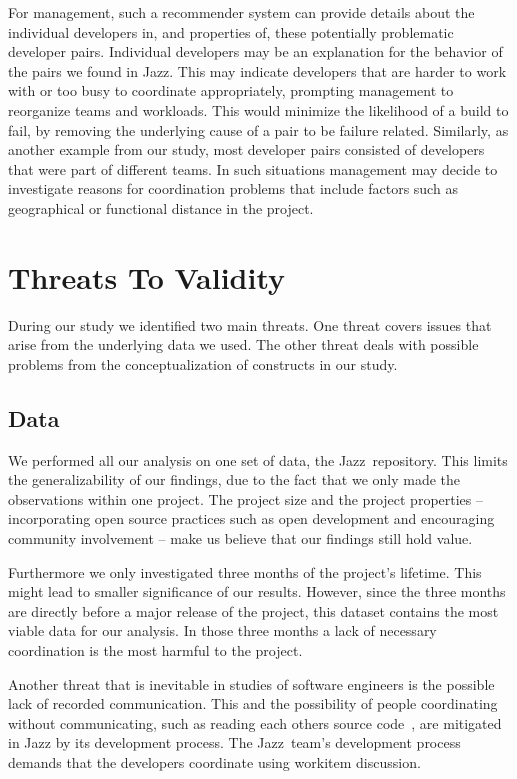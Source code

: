 \documentclass[12pt,oneside]{book}
\begin{document}
For management, such a recommender system can provide details about the
individual developers in, and properties of, these potentially problematic
developer pairs. Individual developers may be an explanation for the behavior of
the pairs we found in Jazz\texttrademark. This may indicate developers that are
harder to work with or too busy to coordinate appropriately, prompting management
to reorganize teams and workloads. This would minimize the likelihood of a build
to fail, by removing the underlying cause of a pair to be failure related.
Similarly, as another example from our study, most developer pairs
consisted of developers that were part of different teams. In such
situations management may decide to investigate reasons for coordination
problems that include factors such as geographical or functional distance in the project.




\section{Threats To Validity}
\label{sec:threats}
During our study we identified two main threats. 
One threat covers issues that arise from the underlying data we used.
The other threat deals with possible problems from the conceptualization of
constructs in our study.

\subsection{Data}
We performed all our analysis on one set of data, the Jazz\texttrademark\
repository. This limits the generalizability of our findings, due to the fact
that we only made the observations within one project. The  
project size and the project properties -- incorporating open
source practices such as open development and encouraging community involvement
-- make us believe that our findings still hold value.

Furthermore we only investigated three months of the project's lifetime. This
might lead to smaller significance of our results. However, since the three
months are directly before a major release of the project, this dataset contains
the most viable data for our analysis. In those three months a lack of necessary
coordination is the most harmful to the project.

Another threat that is inevitable in studies of software engineers is
the possible lack of recorded communication. This and the possibility of people
coordinating without communicating, such as reading each others source
code~\cite{bolici:stc:2009}, are mitigated in Jazz by its development process.
The Jazz\texttrademark\ team's development process demands that the developers
coordinate using workitem discussion. 
\end{document}
